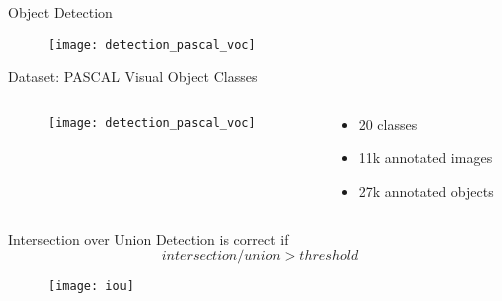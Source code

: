 \begin{frame}{Object Detection}
  \begin{figure}
    \texttt{[image: detection\_pascal\_voc]}
  \end{figure}

\end{frame}


\begin{frame}{Dataset: PASCAL Visual Object Classes}
  \begin{columns}
    \begin{column}{0.48\textwidth}
      \begin{figure}
        \texttt{[image: detection\_pascal\_voc]}
      \end{figure}
    \end{column}
    \begin{column}{0.48\textwidth}
    \begin{itemize}
      \item 20 classes
      \item 11k annotated images
      \item 27k annotated objects
    \end{itemize}

    \end{column}
  \end{columns}

\end{frame}


\begin{frame}{Intersection over Union}
  Detection is correct if
  $$ intersection/union > threshold$$

  \begin{figure}
    \texttt{[image: iou]}
  \end{figure}
\end{frame}


